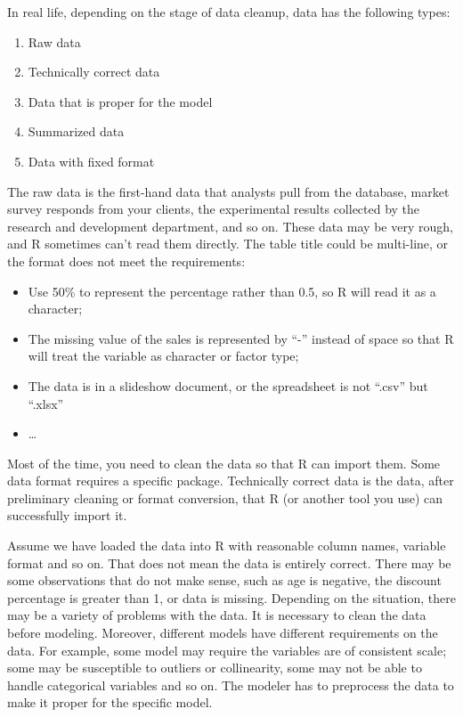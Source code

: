 \documentclass[
  12pt,
]{krantz}
\providecommand{\tightlist}{%
  \setlength{\itemsep}{0pt}\setlength{\parskip}{0pt}}
\begin{document}
In real life, depending on the stage of data cleanup, data has the following types:

\begin{enumerate}
\def\labelenumi{\arabic{enumi}.}
\tightlist
\item
  Raw data
\item
  Technically correct data
\item
  Data that is proper for the model
\item
  Summarized data
\item
  Data with fixed format
\end{enumerate}

The raw data is the first-hand data that analysts pull from the database, market survey responds from your clients, the experimental results collected by the research and development department, and so on. These data may be very rough, and R sometimes can't read them directly. The table title could be multi-line, or the format does not meet the requirements:

\begin{itemize}
\tightlist
\item
  Use 50\% to represent the percentage rather than 0.5, so R will read it as a character;
\item
  The missing value of the sales is represented by ``-'' instead of space so that R will treat the variable as character or factor type;
\item
  The data is in a slideshow document, or the spreadsheet is not ``.csv'' but ``.xlsx''
\item
  \ldots{}
\end{itemize}

Most of the time, you need to clean the data so that R can import them. Some data format requires a specific package. Technically correct data is the data, after preliminary cleaning or format conversion, that R (or another tool you use) can successfully import it.

Assume we have loaded the data into R with reasonable column names, variable format and so on. That does not mean the data is entirely correct. There may be some observations that do not make sense, such as age is negative, the discount percentage is greater than 1, or data is missing. Depending on the situation, there may be a variety of problems with the data. It is necessary to clean the data before modeling. Moreover, different models have different requirements on the data. For example, some model may require the variables are of consistent scale; some may be susceptible to outliers or collinearity, some may not be able to handle categorical variables and so on. The modeler has to preprocess the data to make it proper for the specific model.
\end{document}
